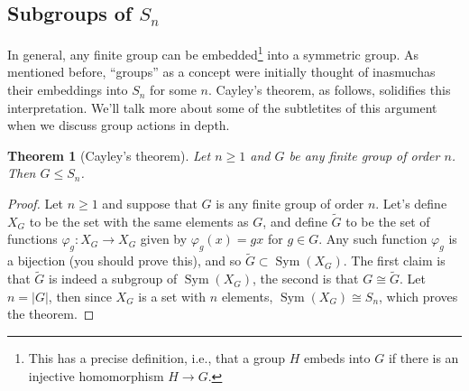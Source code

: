 \documentclass[12pt]{article}
\numberwithin{equation}{subsection}
\newtheorem{thm}[subsection]{Theorem}
\theoremstyle{note}
\newcommand{\Sym}{\operatorname{Sym}}
\begin{document}
\subsection{Subgroups of $S_n$}

In general, any finite group can be embedded\footnote{This has a precise definition, i.e., that a group $H$ embeds into $G$ if there is an injective homomorphism $H\to G$.} into a symmetric group. As mentioned before, ``groups'' as a concept were initially thought of inasmuchas their embeddings into $S_n$ for some $n$. Cayley's theorem, as follows, solidifies this interpretation. We'll talk more about some of the subtletites of this argument when we discuss group actions in depth.


\begin{thm}[Cayley's theorem] 
Let $n\geq 1$ and $G$ be any finite group of order $n$. Then $G\leq S_n$. 
\end{thm}

\begin{proof}
	Let $n\geq 1$ and suppose that $G$ is any finite group of order $n$. Let's define $X_G$ to be the set with the same elements as $G$, and define  $\widetilde{G}$ to be the set of functions $\varphi_g\colon X_G\to X_G$ given by $\varphi_g(x)=gx$ for $g\in G$. Any such function $\varphi_g$ is a bijection (you should prove this), and  so  $\widetilde{G} \subset \Sym(X_G)$. The first claim is that  $\widetilde{G}$ is indeed a subgroup of $\Sym(X_G)$, the second is that $G\cong  \widetilde{G}$. Let $n=|G|$, then since $X_G$ is a set with $n$ elements, $\Sym(X_G)\cong S_n$, which proves the theorem.
\end{proof}
\end{document}
